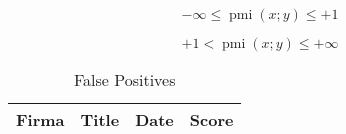 \begin{equation} \label{eq:ourRange1}
	-\infty \leq \operatorname{pmi}(x;y) \leq +1
\end{equation}

\begin{equation} \label{eq:ourRange2}
	+1 < \operatorname{pmi}(x;y) \leq +\infty
\end{equation}


\begin{table}\centering
	\caption{False Positives}\label{tab:FalsePositives}
   	\begin{tabular}{ | p{1.1cm\textwidth} | p{8cm\textwidth} | p{1.5cm\textwidth} | p{1.5cm\textwidth} |}
   	\hline
   	\textbf{Firma}  & \textbf{Title} & \textbf{Date} & \textbf{Score}  \\ \hline


\end{tabular}
\end{table}
